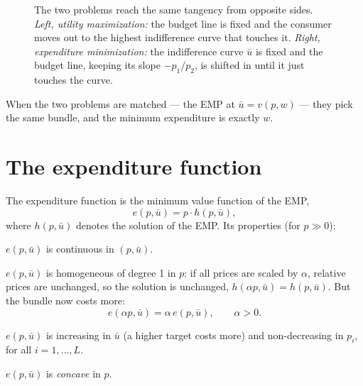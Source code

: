 \documentclass[11pt]{article}
\begin{document}
\begin{figure}[ht]
\centering
{}
\caption{The two problems reach the same tangency from opposite sides.
\emph{Left, utility maximization:} the budget line is fixed and the consumer moves out to the highest
indifference curve that touches it. \emph{Right, expenditure minimization:} the indifference curve $\bar u$ is
fixed and the budget line, keeping its slope $-p_1/p_2$, is shifted in until it just
touches the curve.}
\end{figure}

When the two problems are matched --- the EMP at $\bar u=v(p,w)$ --- they pick the
same bundle, and the minimum expenditure is exactly $w$.


\section{The expenditure function}

The expenditure function is the minimum value function of the EMP,
\[ e(p,\bar u)=p\cdot h(p,\bar u), \]
where $h(p,\bar u)$ denotes the solution of the EMP. Its properties (for $p\gg0$):
\begin{flatlist}
  \item $e(p,\bar u)$ is continuous in $(p,\bar u)$.
  \item $e(p,\bar u)$ is homogeneous of degree 1 in $p$: if all prices are scaled
        by $\alpha$, relative prices are unchanged, so the solution is unchanged,
        $h(\alpha p,\bar u)=h(p,\bar u)$. But the bundle now costs more:
        \[ e(\alpha p,\bar u)=\alpha\,e(p,\bar u),\qquad \alpha>0 . \]
  \item $e(p,\bar u)$ is increasing in $\bar u$ (a higher target costs more) and
        non-decreasing in $p_i$, for all $i=1,\dots,L$.
  \item $e(p,\bar u)$ is \emph{concave} in $p$.
\end{flatlist}
\end{document}
